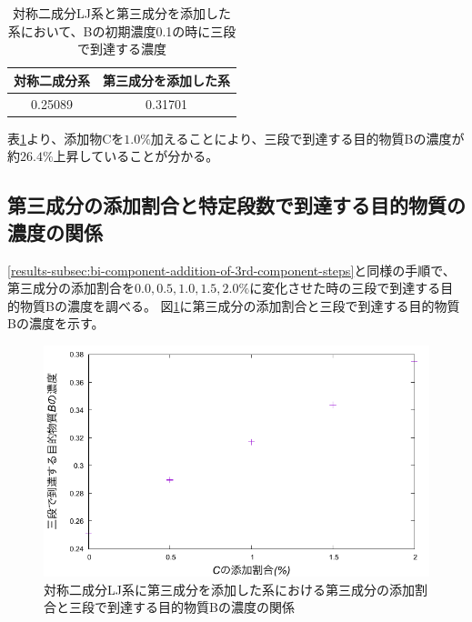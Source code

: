\documentclass[titlepage]{jsreport}
\begin{document}
\begin{table}[htbp]
    \begin{center}
        \caption{対称二成分LJ系と第三成分を添加した系において、Bの初期濃度0.1の時に三段で到達する濃度}
        \label{table:bi-component-addition-of-3rd-component-steps}
        \begin{tabular}{c c}
            対称二成分系 & 第三成分を添加した系 \\
            \hline
            0.25089 & 0.31701 \\
        \end{tabular}
    \end{center}
\end{table}

表\ref{table:bi-component-addition-of-3rd-component-steps}より、添加物Cを$1.0\%$加えることにより、三段で到達する目的物質Bの濃度が約$26.4\%$上昇していることが分かる。


\subsection{第三成分の添加割合と特定段数で到達する目的物質の濃度の関係} \label{results-subsec:bi-component-addition-of-3rd-component-addition-ratio-steps}
\ref{results-subsec:bi-component-addition-of-3rd-component-steps}と同様の手順で、第三成分の添加割合を$0.0,0.5,1.0,1.5,2.0\%$に変化させた時の三段で到達する目的物質Bの濃度を調べる。
図\ref{fig:bi-component-addition-of-3rd-component-addition-ratio-steps}に第三成分の添加割合と三段で到達する目的物質Bの濃度を示す。

\begin{figure}[htbp]
    \begin{center}
        \includegraphics[width=14cm]{fig/3rd-component-addition-ratio-steps/3rd-component-addition-ratio-steps.pdf}
    \end{center}
    \caption{対称二成分LJ系に第三成分を添加した系における第三成分の添加割合と三段で到達する目的物質Bの濃度の関係}
    \label{fig:bi-component-addition-of-3rd-component-addition-ratio-steps}
\end{figure}
\end{document}
